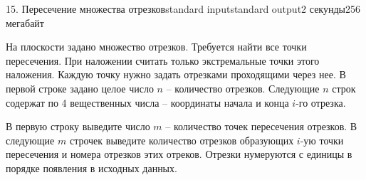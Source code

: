 \begin{problem}{15. Пересечение множества отрезков}{standard input}{standard output}{2 секунды}{256 мегабайт}

На плоскости задано множество отрезков. Требуется найти все точки пересечения.
При наложении считать только экстремальные точки этого наложения.
Каждую точку нужно задать отрезками проходящими через нее.
\InputFile
В первой строке задано целое число $n$ -- количество отрезков.
Следующие $n$ строк содержат по 4 вещественных числа -- координаты начала и конца $i$-го отрезка.

\OutputFile
В первую строку выведите число $m$ -- количество точек пересечения отрезков.
В следующие $m$ строчек выведите количество отрезков образующих $i$-ую точки пересечения и номера отрезков этих отреков. Отрезки нумеруются с единицы в порядке появления в исходных данных.  
\Examples

\begin{example}%
%
\end{example}

\end{problem}